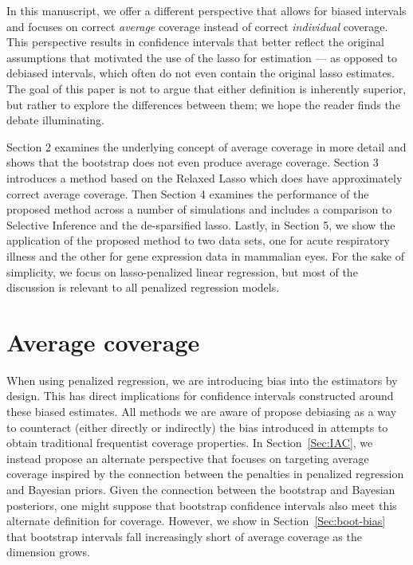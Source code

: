 In this manuscript, we offer a different perspective that allows for biased intervals and focuses on correct \emph{average} coverage instead of correct \emph{individual} coverage. This perspective results in confidence intervals that better reflect the original assumptions that motivated the use of the lasso for estimation --- as opposed to debiased intervals, which often do not even contain the original lasso estimates. The goal of this paper is not to argue that either definition is inherently superior, but rather to explore the differences between them; we hope the reader finds the debate illuminating.

Section 2 examines the underlying concept of average coverage in more detail and shows that the bootstrap does not even produce average coverage. Section 3 introduces a method based on the Relaxed Lasso which does have approximately correct average coverage. Then Section 4 examines the performance of the proposed method across a number of simulations and includes a comparison to Selective Inference and the de-sparsified lasso. Lastly, in Section 5, we show the application of the proposed method to two data sets, one for acute respiratory illness and the other for gene expression data in mammalian eyes. For the sake of simplicity, we focus on lasso-penalized linear regression, but most of the discussion is relevant to all penalized regression models.

\section{Average coverage}
\label{Sec:difficulties}

When using penalized regression, we are introducing bias into the estimators by design. This has direct implications for confidence intervals constructed around these biased estimates. All methods we are aware of propose debiasing as a way to counteract (either directly or indirectly) the bias introduced in attempts to obtain traditional frequentist coverage properties. In Section~\ref{Sec:IAC}, we instead propose an alternate perspective that focuses on targeting average coverage inspired by the connection between the penalties in penalized regression and Bayesian priors. Given the connection between the bootstrap and Bayesian posteriors, one might suppose that bootstrap confidence intervals also meet this alternate definition for coverage. However, we show in Section~\ref{Sec:boot-bias} that bootstrap intervals fall increasingly short of average coverage as the dimension grows.

